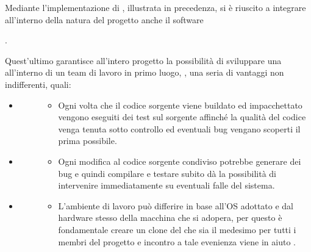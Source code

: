 \documentclass[letterpaper,10pt,italian,openany,oneside]{sphinxmanual}
\begin{document}
\noindent{}

Mediante l’implementazione di , illustrata in precedenza, si è riuscito a integrare all’interno della natura del progetto
anche il software  %
\begin{footnote}[7]\sphinxAtStartFootnote
{}
%
\end{footnote}.

Quest’ultimo garantisce all’intero progetto la possibilità di sviluppare una  all’interno di un team di lavoro in primo luogo, , una seria di vantaggi non indifferenti, quali:
\begin{itemize}
\item {} \begin{description}
\item[{}] \leavevmode\begin{itemize}
\item {} 
Ogni volta che il codice sorgente viene buildato ed impacchettato vengono eseguiti dei test sul sorgente affinché la qualità del codice venga tenuta sotto controllo ed eventuali bug vengano scoperti il prima possibile.

\end{itemize}

\end{description}

\item {} \begin{description}
\item[{}] \leavevmode\begin{itemize}
\item {} 
Ogni modifica al codice sorgente condiviso potrebbe generare dei bug e quindi compilare e testare subito dà la possibilità di intervenire immediatamente su eventuali falle del sistema.

\end{itemize}

\end{description}

\item {} \begin{description}
\item[{}] \leavevmode\begin{itemize}
\item {} 
L’ambiente di lavoro può differire in base all’OS adottato e dal hardware stesso della macchina che si adopera, per questo è fondamentale creare un clone del  che sia il medesimo per tutti i membri del progetto e incontro a tale evenienza viene in aiuto .


\end{itemize}
\end{description}
\end{itemize}
\end{document}
